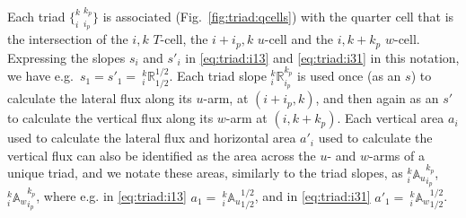 \documentclass[NEMO_book]{subfiles}
\begin{document}
Each triad $\{_i^k\:_{i_p}^{k_p}\}$ is associated (Fig.~\ref{fig:triad:qcells}) with the quarter
cell that is the intersection of the $i,k$ $T$-cell, the $i+i_p,k$
$u$-cell and the $i,k+k_p$ $w$-cell. Expressing the slopes $s_i$ and
$s'_i$ in \eqref{eq:triad:i13} and \eqref{eq:triad:i31} in this notation, we have
e.g.\ $s_1=s'_1={\:}_i^k \mathbb{R}_{1/2}^{1/2}$. Each triad slope $_i^k
\mathbb{R}_{i_p}^{k_p}$ is used once (as an $s$) to calculate the
lateral flux along its $u$-arm, at $(i+i_p,k)$, and then again as an
$s'$ to calculate the vertical flux along its $w$-arm at
$(i,k+k_p)$. Each vertical area $a_i$ used to calculate the lateral
flux and horizontal area $a'_i$ used to calculate the vertical flux
can also be identified as the area across the $u$- and $w$-arms of a
unique triad, and we notate these areas, similarly to the triad
slopes, as $_i^k{\mathbb{A}_u}_{i_p}^{k_p}$,
$_i^k{\mathbb{A}_w}_{i_p}^{k_p}$, where e.g. in \eqref{eq:triad:i13}
$a_{1}={\:}_i^k{\mathbb{A}_u}_{1/2}^{1/2}$, and in \eqref{eq:triad:i31}
$a'_{1}={\:}_i^k{\mathbb{A}_w}_{1/2}^{1/2}$.
\end{document}
